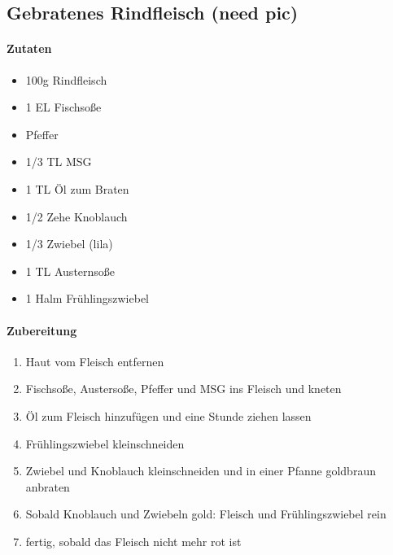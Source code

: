 \newpage
\subsection{Gebratenes Rindfleisch (need pic)}
\paragraph{Zutaten}
\begin{itemize}[noitemsep]
	\item 100g Rindfleisch
	\item 1 EL Fischsoße
	\item Pfeffer
	\item 1/3 TL MSG
	\item 1 TL Öl zum Braten
	\item 1/2 Zehe Knoblauch
	\item 1/3 Zwiebel (lila)
	\item 1 TL Austernsoße
	\item 1 Halm Frühlingszwiebel
\end{itemize}
\paragraph{Zubereitung}
\begin{enumerate}[noitemsep]
	\item Haut vom Fleisch entfernen
	\item Fischsoße, Austersoße, Pfeffer und  MSG ins Fleisch und kneten
	\item Öl zum Fleisch hinzufügen und eine Stunde ziehen lassen
	\item Frühlingszwiebel kleinschneiden
	\item Zwiebel und Knoblauch kleinschneiden und in einer Pfanne goldbraun anbraten
	\item Sobald Knoblauch und Zwiebeln gold: Fleisch und Frühlingszwiebel rein
	\item fertig, sobald das Fleisch nicht mehr rot ist
\end{enumerate}
\vspace{0.5cm}
